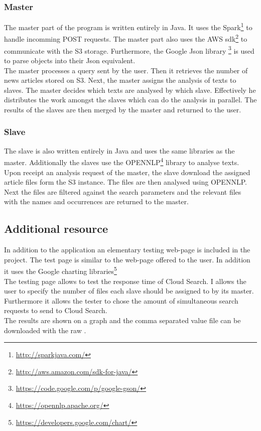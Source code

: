 \documentclass[11pt]{article} %
\begin{document}
\subsubsection{Master}
The master part of the program is written entirely in Java.
It uses the Spark\footnote{\url{http://sparkjava.com/}} to handle incomming POST requests.
The master part also uses the AWS sdk\footnote{\url{http://aws.amazon.com/sdk-for-java/}} to communicate with the S3 storage.
Furthermore, the Google Json library \footnote{\url{https://code.google.com/p/google-gson/}} is used to parse objects into their Json equivalent.\\
The master processes a query sent by the user.
Then it retrieves the number of news articles stored on S3.
Next, the master assigns the analysis of texts to slaves.
The master decides which texts are analysed by which slave.
Effectively he distributes the work amongst the slaves which can do the analysis in parallel.
The results of the slaves are then merged by the master and returned to the user.

\subsubsection{Slave}
The slave is also written entirely in Java and uses the same libraries as the master.
Additionally the slaves use the OPENNLP\footnote{\url{https://opennlp.apache.org/}} library to analyse texts.\\
Upon receipt an analysis request of the master, the slave download the assigned article files form the S3 instance.
The files are then analysed using OPENNLP.
Next the files are filtered against the search parameters and the relevant files with the names and occurrences are returned to the master.

\subsection{Additional resource}
In addition to the application an elementary testing web-page is included in the project.
The test page is similar to the web-page offered to the user.
In addition it uses the Google charting libraries\footnote{\url{https://developers.google.com/chart/}}\\
The testing page allows to test the response time of Cloud Search.
I allows the user to specify the number of files each slave should be assigned to by its master.
Furthermore it allows the tester to chose the amount of simultaneous search requests to send to Cloud Search.\\
The results are shown on a graph and the comma separated value file can be downloaded with the raw .
\end{document}
